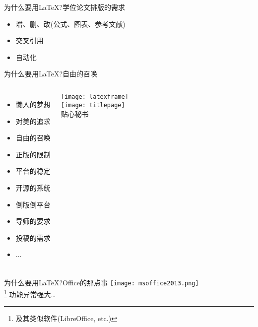 \begin{frame}{为什么要用\LaTeX?}{学位论文排版的需求}
\begin{spacing}{0.85}
\begin{itemize}
    \begin{itemize}
    \item 增、删、改(公式、图表、参考文献)
    \item 交叉引用
    \item \alert{自动化}
    \end{itemize}  
  \end{itemize}
  \end{spacing}
\end{frame}

\begin{frame}{为什么要用\LaTeX?}{自由的召唤}
  \begin{columns}[c]
    \begin{itemize} \setlength\itemsep{1em}
    \item \alert{懒人}的梦想
    \item 对\alert{美}的追求
    \item \alert{自由}的召唤
    \item \alert{正版}的限制
    \item 平台的\alert{稳定}
    \item \alert{开源}的系统
    \item \alert{倒版倒平台}
    \item \alert{导师}的要求
    \item \alert{投稿}的需求
    \item $\ldots$\hphantom{倒版倒a}%
    \end{itemize}
    \begin{center}
      \texttt{[image: latexframe]}\\
      \texttt{[image: titlepage]}\\%
      贴心\alert{秘书}
    \end{center}
  \end{columns}
\end{frame}

\begin{frame}{为什么要用\LaTeX?}{Office的那点事}%
  \centering
  \texttt{[image: msoffice2013.png]}\\[.5em]
  \msoffice{} \footnote[frame,1]{及其类似软件(LibreOffice, etc.)}%
  功能异常强大\ldots
\end{frame}

